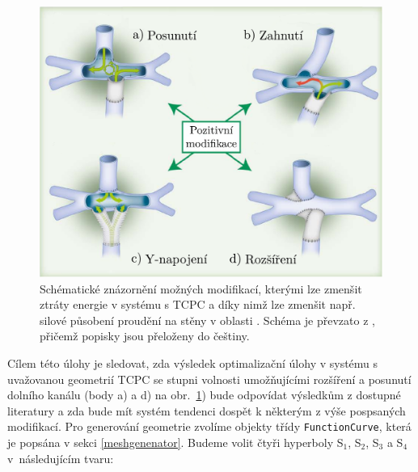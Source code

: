 \begin{figure}[H]
	\centering
	\vspace{8mm}
	\includegraphics[width=0.75	\textwidth]{Images/energyloss.pdf}
	\vspace{9mm}
	\caption{Schématické znázornění možných modifikací, kterými lze zmenšit ztráty energie v systému s TCPC a díky nimž lze zmenšit např. silové působení proudění na stěny v oblasti \cite{Rijnberg2018}. Schéma je převzato z \cite{Rijnberg2018}, přičemž popisky jsou přeloženy do češtiny.}
	\label{fig:tcpc modifikace}
	\vspace{1.8mm}
\end{figure}


Cílem této úlohy je sledovat, zda výsledek optimalizační úlohy v systému s uvažovanou geometrií TCPC se stupni volnosti umožňujícími rozšíření a posunutí dolního kanálu (body a) a d) na obr.~\ref{fig:tcpc modifikace}) bude odpovídat výsledkům z dostupné literatury a zda bude mít systém tendenci dospět k některým z výše pospsaných modifikací. Pro generování geometrie zvolíme objekty třídy \texttt{FunctionCurve}, která je popsána v sekci \ref{meshgenenator}. Budeme volit čtyři hyperboly S$_1$, S$_2$, S$_3$ a S$_4$ v~následujícím tvaru:

